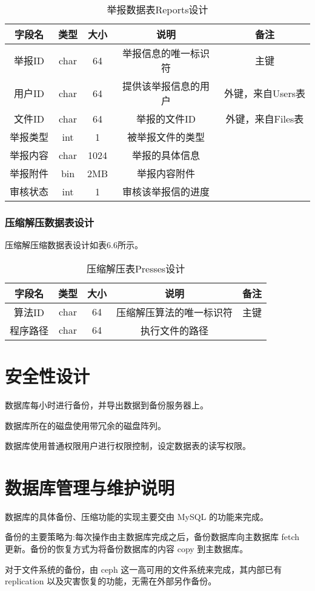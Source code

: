 \begin{table}[htbp]
\centering
\caption{举报数据表Reports设计} \label{tab:reports-database}
\begin{tabular}{|c|c|c|c|c|}
    \hline
    字段名 & 类型 & 大小 & 说明 & 备注 \\
    \hline
    举报ID & char & 64 & 举报信息的唯一标识符 & 主键\\
    \hline
    用户ID & char & 64 & 提供该举报信息的用户 & 外键，来自Users表\\
    \hline
    文件ID & char & 64 & 举报的文件ID & 外键，来自Files表\\
    \hline
    举报类型 & int & 1 & 被举报文件的类型 & \\
    \hline
    举报内容 & char & 1024 & 举报的具体信息 & \\
    \hline
    举报附件 & bin & 2MB & 举报内容附件 & \\
    \hline
    审核状态 & int & 1 & 审核该举报信的进度 & \\
    \hline
\end{tabular}
\end{table}

\subsubsection{压缩解压数据表设计}
压缩解压缩数据表设计如表6.6所示。
\begin{table}[htbp]
\centering
\caption{压缩解压表Presses设计} \label{tab:presses-database}
\begin{tabular}{|c|c|c|c|c|}
    \hline
    字段名 & 类型 & 大小 & 说明 & 备注 \\
    \hline
    算法ID & char & 64 & 压缩解压算法的唯一标识符 & 主键\\
    \hline
    程序路径 & char & 64 & 执行文件的路径 & \\
    \hline
\end{tabular}
\end{table}

\section{安全性设计}
数据库每小时进行备份，并导出数据到备份服务器上。

数据库所在的磁盘使用带冗余的磁盘阵列。

数据库使用普通权限用户进行权限控制，设定数据表的读写权限。

\section{数据库管理与维护说明}
数据库的具体备份、压缩功能的实现主要交由 MySQL 的功能来完成。

备份的主要策略为:每次操作由主数据库完成之后，备份数据库向主数据库 fetch 更新。备份的恢复方式为将备份数据库的内容 copy 到主数据库。

对于文件系统的备份，由 ceph 这一高可用的文件系统来完成，其内部已有 replication 以及灾害恢复的功能，无需在外部另作备份。